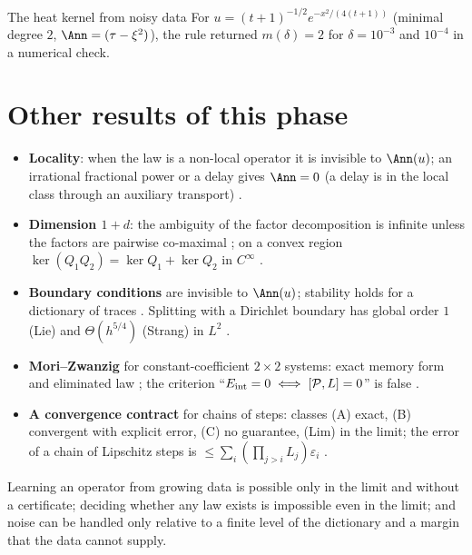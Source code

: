 \begin{example}{The heat kernel from noisy data}
For $u=(t+1)^{-1/2}e^{-x^2/(4(t+1))}$ (minimal degree $2$, $\Ann=(\tau-\xi^2)$), the rule returned $m(\delta)=2$ for $\delta=10^{-3}$ and $10^{-4}$ in a numerical check.
\end{example}

\section{Other results of this phase}

\begin{itemize}
\item \textbf{Locality}: when the law is a non-local operator it is invisible to $\Ann(u)$; an irrational fractional power or a delay gives $\Ann=0$ (a delay is in the local class through an auxiliary transport) .
\item \textbf{Dimension $1+d$}: the ambiguity of the factor decomposition is infinite unless the factors are pairwise co-maximal ; on a convex region $\ker(Q_1Q_2)=\ker Q_1+\ker Q_2$ in $C^\infty$ .
\item \textbf{Boundary conditions} are invisible to $\Ann(u)$; stability holds for a dictionary of traces . Splitting with a Dirichlet boundary has global order $1$ (Lie) and $\Theta(h^{5/4})$ (Strang) in $L^2$ .
\item \textbf{Mori--Zwanzig} for constant-coefficient $2\times2$ systems: exact memory form and eliminated law ; the criterion ``$E_{\rm int}=0\iff[\mathcal P,L]=0$'' is false .
\item \textbf{A convergence contract} for chains of steps: classes (A) exact, (B) convergent with explicit error, (C) no guarantee, (Lim) in the limit; the error of a chain of Lipschitz steps is $\le\sum_i(\prod_{j>i}L_j)\varepsilon_i$ .
\end{itemize}

\begin{takeaway}
Learning an operator from growing data is possible only in the limit and without a certificate; deciding whether any law exists is impossible even in the limit; and noise can be handled only relative to a finite level of the dictionary and a margin that the data cannot supply.
\end{takeaway}
